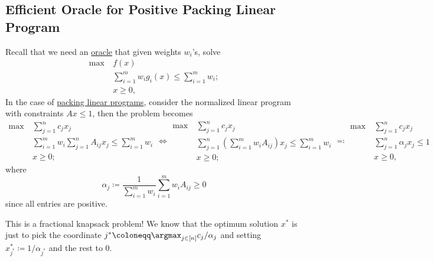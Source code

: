 \subsection{Efficient Oracle for Positive Packing Linear Program}
Recall that we need an \hyperref[eq:MWU-oracle]{oracle} that given weights \(w_i\)'s, solve
\[
	\begin{aligned}
		\max~ & f(x)                                                \\
		      & \sum_{i=1}^{m} w_i g_i(x) \leq \sum_{i=1}^{m} w_i ; \\
		      & x \geq 0,
	\end{aligned}
\]
In the case of \hyperref[def:packing-LP]{packing linear programs}, consider the normalized linear program with constraints \(Ax \leq 1\), then the problem becomes
\begin{equation}\label{eq:MWU-oracle-LP}
	\begin{aligned}
		\max~ & \sum_{j=1}^{n} c_j x_j                                               \\
		      & \sum_{i=1}^{m} w_i \sum_{j=1}^{n} A_{ij} x_j \leq \sum_{i=1}^{m} w_i \\
		      & x\geq 0;
	\end{aligned}
	\iff \begin{aligned}
		\max~ & \sum_{j=1}^{n} c_j x_j                                                              \\
		      & \sum_{j=1}^{n} \left( \sum_{i=1}^{m} w_i A_{ij} \right) x_j \leq \sum_{i=1}^{m} w_i \\
		      & x\geq 0;
	\end{aligned}
	\eqqcolon \begin{aligned}
		\max~ & \sum_{j=1}^{n} c_j x_j              \\
		      & \sum_{j=1}^{n} \alpha _j x_j \leq 1 \\
		      & x\geq 0,
	\end{aligned}
\end{equation}
where
\[
	\alpha _j
	\coloneqq \frac{1}{\sum_{i=1}^{m} w_i} \sum_{i=1}^{m} w_i A_{ij} \geq 0
\]
since all entries are positive.

\begin{intuition}
	This is a fractional knapsack problem! We know that the optimum solution \(x^{\ast} \) is just to pick the coordinate \(j^{\ast} \coloneqq \argmax_{j \in [n]} c_j / \alpha _j\) and setting \(x^{\ast} _{j^{\ast} } \coloneqq 1 / \alpha _{j^{\ast} }\) and the rest to \(0\).
\end{intuition}

